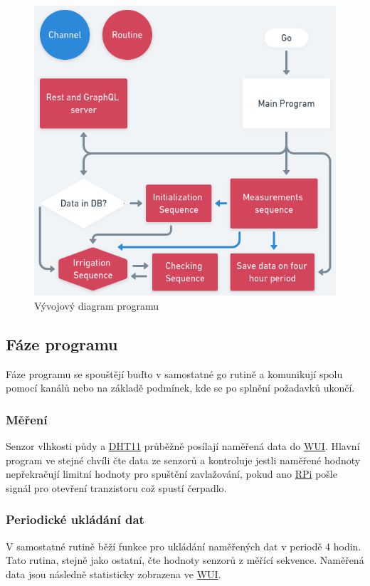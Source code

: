\documentclass[12pt,a4paper]{article}
\begin{document}
\begin{figure}[h]
	\centering
	\includegraphics[width=0.72\linewidth]{go.png}
	\caption{Vývojový diagram programu}
\end{figure}

\subsection{Fáze programu}

Fáze programu se spouštějí buďto v samostatné go rutině a komunikují spolu pomocí kanálů nebo na základě podmínek, kde se po splnění požadavků ukončí.

\subsubsection{Měření}

Senzor vlhkosti půdy a \underline{\ac{DHT11}} průběžně posílají naměřená data do \underline{\ac{WUI}}. Hlavní program ve stejné chvíli čte data ze senzorů a kontroluje jestli naměřené hodnoty nepřekračují limitní hodnoty pro spuštění zavlažování, pokud ano \underline{\ac{RPi}} pošle signál pro otevření tranzistoru což spustí čerpadlo.

\subsubsection{Periodické ukládání dat}

V samostatné rutině běží funkce pro ukládání naměřených dat v periodě 4 hodin. Tato rutina, stejně jako ostatní, čte hodnoty senzorů z měřící sekvence. Naměřená data jsou následně statisticky zobrazena ve \underline{\ac{WUI}}.
\end{document}
